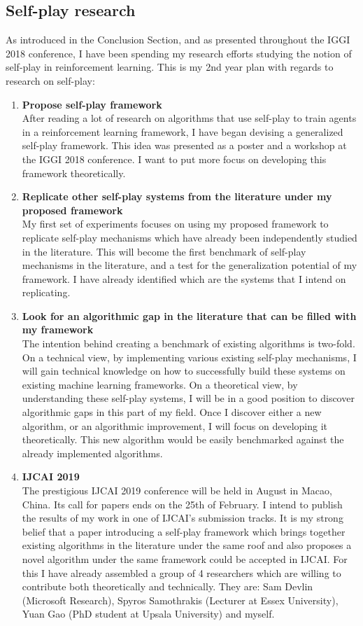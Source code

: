 \documentclass{article}
\begin{document}
\subsection{Self-play research}
As introduced in the Conclusion Section, and as presented throughout the IGGI 2018 conference, I have been spending my research efforts studying the notion of self-play in reinforcement learning. This is my 2nd year plan with regards to research on self-play:
\begin{enumerate}
    \item \textbf{Propose self-play framework} \\
        After reading a lot of research on algorithms that use self-play to train agents in a reinforcement learning framework, I have began devising a generalized self-play framework. This idea was presented as a poster and a workshop at the IGGI 2018 conference. I want to put more focus on developing this framework theoretically. 
    \item \textbf{Replicate other self-play systems from the literature under my proposed framework} \\
        My first set of experiments focuses on using my proposed framework to replicate self-play mechanisms which have already been independently studied in the literature. This will become the first benchmark of self-play mechanisms in the literature, and a test for the generalization potential of my framework. I have already identified which are the systems that I intend on replicating.
    \item \textbf{Look for an algorithmic gap in the literature that can be filled with my framework} \\
        The intention behind creating a benchmark of existing algorithms is two-fold. On a technical view, by implementing various existing self-play mechanisms, I will gain technical knowledge on how to successfully build these systems on existing machine learning frameworks. On a theoretical view, by understanding these self-play systems, I will be in a good position to discover algorithmic gaps in this part of my field. Once I discover either a new algorithm, or an algorithmic improvement, I will focus on developing it theoretically. This new algorithm would be easily benchmarked against the already implemented algorithms.
    \item \textbf{IJCAI 2019} \\
        The prestigious IJCAI 2019 conference will be held in August in Macao, China. Its call for papers ends on the 25th of February. I intend to publish the results of my work in one of IJCAI's submission tracks. It is my strong belief that a paper introducing a self-play framework which brings together existing algorithms in the literature under the same roof and also proposes a novel algorithm under the same framework could be accepted in IJCAI\@. For this I have already assembled a group of 4 researchers which are willing to contribute both theoretically and technically. They are: Sam Devlin (Microsoft Research), Spyros Samothrakis (Lecturer at Essex University), Yuan Gao (PhD student at Upsala University) and myself.

\end{enumerate}
\end{document}
